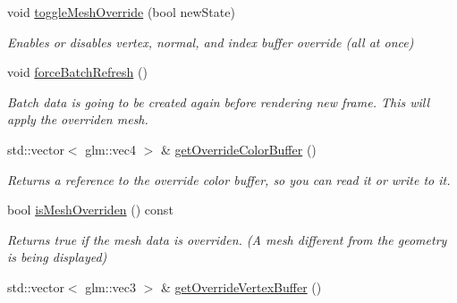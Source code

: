 \begin{DoxyCompactItemize}
\mbox{\label{classpepr3d_1_1_model_view_a4c1fd212021f24db3f703f039bcc3bf2}} 
void \mbox{\hyperlink{classpepr3d_1_1_model_view_a4c1fd212021f24db3f703f039bcc3bf2}{toggle\+Mesh\+Override}} (bool new\+State)
\begin{DoxyCompactList}\small\item\em Enables or disables vertex, normal, and index buffer override (all at once) \end{DoxyCompactList}\item 
\mbox{\label{classpepr3d_1_1_model_view_a4546779d56626083622f7bdefcbd0bde}} 
void \mbox{\hyperlink{classpepr3d_1_1_model_view_a4546779d56626083622f7bdefcbd0bde}{force\+Batch\+Refresh}} ()
\begin{DoxyCompactList}\small\item\em Batch data is going to be created again before rendering new frame. This will apply the overriden mesh. \end{DoxyCompactList}\item 
\mbox{\label{classpepr3d_1_1_model_view_a27cbaf51762a74685b86a58103b5a1e8}} 
std\+::vector$<$ glm\+::vec4 $>$ \& \mbox{\hyperlink{classpepr3d_1_1_model_view_a27cbaf51762a74685b86a58103b5a1e8}{get\+Override\+Color\+Buffer}} ()
\begin{DoxyCompactList}\small\item\em Returns a reference to the override color buffer, so you can read it or write to it. \end{DoxyCompactList}\item 
\mbox{\label{classpepr3d_1_1_model_view_a7dbddb9b59b9c869b9ee48bc0fcd03c2}} 
bool \mbox{\hyperlink{classpepr3d_1_1_model_view_a7dbddb9b59b9c869b9ee48bc0fcd03c2}{is\+Mesh\+Overriden}} () const
\begin{DoxyCompactList}\small\item\em Returns true if the mesh data is overriden. (A mesh different from the geometry is being displayed) \end{DoxyCompactList}\item 
\mbox{\label{classpepr3d_1_1_model_view_aebca60d3e5b812601056f52918154370}} 
std\+::vector$<$ glm\+::vec3 $>$ \& \mbox{\hyperlink{classpepr3d_1_1_model_view_aebca60d3e5b812601056f52918154370}{get\+Override\+Vertex\+Buffer}} ()

\end{DoxyCompactItemize}

